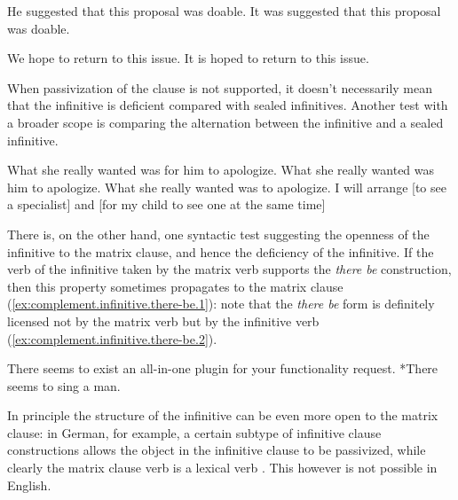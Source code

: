 \documentclass[UTF8, a4paper, oneside, scheme=plain, 12pt]{ctexbook}
\newcommand{\form}[1]{\emph{#1}}
\begin{document}
\begin{exe}
    \ex \begin{xlist}
        \ex He suggested that this proposal was doable.
        \ex It was suggested that this proposal was doable.
    \end{xlist}
    \ex\label{ex:complement.infinitive.pass-clause.1} \begin{xlist}
        \ex We hope to return to this issue.
        \ex It is hoped to return to this issue.
    \end{xlist}
\end{exe}

When passivization of the clause is not supported, 
it doesn't necessarily mean that the infinitive is deficient compared with sealed infinitives.
Another test with a broader scope is comparing the alternation between the infinitive and a sealed infinitive.

\begin{exe}
    \ex What she really wanted was for him to apologize.
    \ex *What she really wanted was him to apologize.
    \ex What she really wanted was to apologize.
    \ex I will arrange [to see a specialist] and [for my child to see one at the same time] 
\end{exe}

There is, on the other hand, one syntactic test suggesting 
the openness of the infinitive to the matrix clause, 
and hence the deficiency of the infinitive.
If the verb of the infinitive taken by the matrix verb supports the \form{there be} construction, 
then this property sometimes propagates to the matrix clause
(\ref{ex:complement.infinitive.there-be.1}): 
note that the \form{there be} form is definitely licensed 
not by the matrix verb but by the infinitive verb
(\ref{ex:complement.infinitive.there-be.2}).

\begin{exe}
    \ex\label{ex:complement.infinitive.there-be.1} There seems to exist an all-in-one plugin for your functionality request.
    \ex\label{ex:complement.infinitive.there-be.2} *There seems to sing a man.
\end{exe}

In principle the structure of the infinitive can be even more open to the matrix clause: 
in German, for example, a certain subtype of infinitive clause constructions 
allows the object in the infinitive clause to be passivized, 
while clearly the matrix clause verb is a lexical verb \citep{wurmbrand2002syntactic}.
This however is not possible in English.
\end{document}
